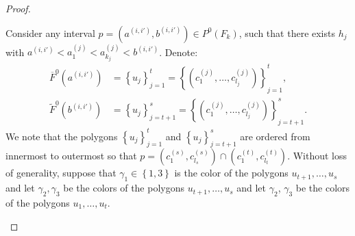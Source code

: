 \documentclass[12pt]{article}
\theoremstyle{definition}
\begin{document}
\begin{proof}
\begin{itemize}
                 Consider any interval
                 $p = \left(a^{\left(i, i'\right)},
                 b^{\left(i, i'\right)}\right)
                 \in P^{0}\left(F_{k}\right)$,
                 such that there
                 exists $h_{j}$ with
                 $a^{\left(i, i'\right)} <
                 a_1^{\left(j\right)} < a_{k_{j}}^{\left(j\right)}
                 < b^{\left(i, i'\right)}$.
                 Denote:
                 \begin{align*}
                     \overline{F}^{0}\left(a^{\left(i, i'\right)}\right) &= 
                     \left\{u_{j}\right\}_{j = 1}^{t} = 
                     \left\{\left(c_1^{\left(j\right)}, \ldots, 
                     c_{l_{j}}^{\left(j\right)}\right)\right\}_{j =1}^{t}, \\
                     \widetilde{F}^{0}\left(b^{\left(i, i'\right)}\right) &= 
                     \left\{u_{j}\right\}_{j = t+1}^{s} = 
                     \left\{\left(c_1^{\left(j\right)}, \ldots,
                     c_{l_{j}}^{\left(j\right)}\right)\right\}_{j =t +1}^{s}.
                 \end{align*}
                 We note that the polygons
                 $\left\{u_{j}\right\}_{j=1}^{t}$ 
                 and $\left\{u_{j}\right\}_{j=t+1}^{s}$ 
                 are ordered from innermost
                 to outermost so that
                 $p = \left(c_1^{\left(s\right)}, c_{l_{s}}^{\left(s\right)}\right)
                 \cap \left(c_1^{\left(t\right)},
                 c_{l_{t}}^{\left(t\right)}\right)$.
                 Without loss of generality,
                 suppose that $\gamma_1 \in 
                 \left\{1, 3\right\}$ is the
                 color of the polygons 
                 $u_{t+1}, \ldots, u_{s}$ 
                 and let $\gamma_2, \gamma_3$
                 be the colors of the polygons
                 $u_{t+1}, \ldots, u_{s}$ 
                 and let $\gamma_2$, $\gamma_3$
                 be the colors of the polygons
                 $u_1, \ldots, u_{t}$.
                 

\end{itemize}
\end{proof}
\end{document}

